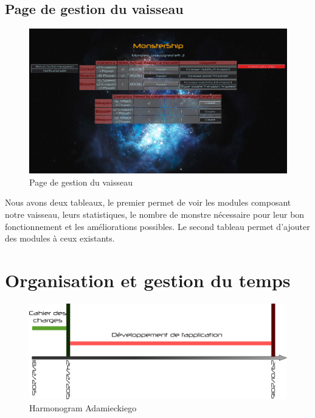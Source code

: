 \documentclass[a4paper,11pt]{report}
\begin{document}
    \section{Page de gestion du vaisseau}
        \begin{figure}[H]
            \begin{center}
                \includegraphics[width=\textwidth]{maquette/screens/manage.png}
                \caption{Page de gestion du vaisseau}
                \label{fig:gestion}
            \end{center}
        \end{figure}
        Nous avons deux tableaux, le premier permet de voir les modules composant notre vaisseau, leurs statistiques, le nombre de monstre nécessaire pour leur bon fonctionnement et les améliorations possibles. Le second tableau permet d'ajouter des modules à ceux existants.

\chapter{Organisation et gestion du temps}
    \begin{figure}[H]
        \begin{center}
            \includegraphics[width=\textwidth]{gantt.png}
            \caption{Harmonogram Adamieckiego}
            \label{fig:gantt}
        \end{center}
    \end{figure}
\end{document}
